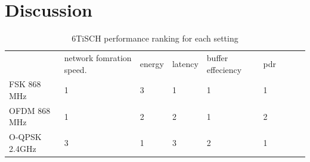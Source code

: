 \documentclass[journal]{IEEEtran}
\newcommand{\fsk}          {FSK 868 MHz}
\newcommand{\oqpsk}        {O-QPSK 2.4GHz}
\newcommand{\ofdm}         {OFDM 868 MHz}
\begin{document}
\section{Discussion}
\label{sec:discussion}
\begin{table}[t]
 \caption {6TiSCH performance ranking for each setting} \label{tab:summary}
\begin{tabular}{lllllllll}
      & network fomration speed. & energy & latency & buffer effeciency & pdr &  &  &  \\
\fsk   & 1                        & 3      & 1       & 1                 & 1   &  &  &  \\
\ofdm  & 1                        & 2      & 2       & 1                 & 2   &  &  &  \\
\oqpsk & 3                        & 1      & 3       & 2                 & 1   &  &  & 
\end{tabular}
\end{table}




\printbibliography

\end{document}
